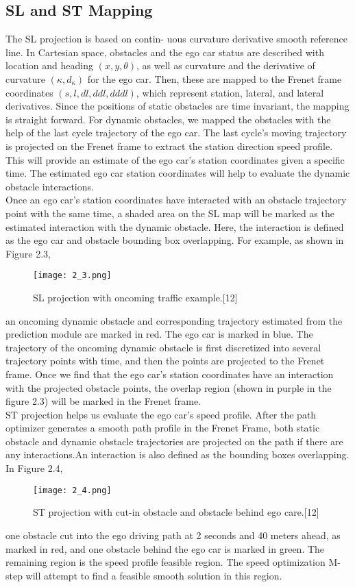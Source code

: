 \documentclass{thesisreport}
\begin{document}
\subsection{SL and ST Mapping}
The SL projection is based on contin-
uous curvature derivative smooth reference line. In Cartesian space, obstacles and the
ego car status are described with location and heading $(x, y, θ)$, as well as curvature and the derivative of curvature $(\kappa, d_{\kappa})$ for the ego car. Then, these are mapped to the Frenet frame coordinates $(s, l, dl, ddl, dddl)$, which represent station, lateral, and lateral derivatives. Since the positions of static obstacles are time invariant, the mapping is straight forward. For dynamic obstacles, we mapped the obstacles with the help of the last cycle trajectory of the ego car. The last cycle’s moving trajectory is projected on the Frenet frame to extract the station direction speed profile. This will provide an estimate of the ego car’s station coordinates given a specific time. The estimated ego car station coordinates will help to evaluate the dynamic obstacle interactions.\\
\indent
Once an ego car’s station coordinates have interacted with an obstacle trajectory point with the same time, a shaded area on the SL map will be marked as the estimated interaction with the dynamic obstacle. Here, the interaction is defined as the ego car and obstacle bounding box overlapping. For example, as shown in Figure 2.3, 
  \begin{figure}[ht]
	\centering
	\texttt{[image: 2\_3.png]}
	\caption{SL projection with oncoming traffic example.[12]}
	\label{fig:2.3} 
\end{figure}
an oncoming dynamic obstacle and corresponding trajectory estimated from the prediction module are marked in red. The ego car is marked in blue. The trajectory of the oncoming dynamic obstacle is first discretized into several trajectory points with time, and then the points are projected to the Frenet frame. Once we find that the ego car’s station coordinates have an interaction with the projected obstacle points, the overlap region (shown in purple in the figure 2.3) will be marked in the Frenet frame.\\
\indent
ST projection helps us evaluate the ego car’s speed profile. After the path optimizer generates a smooth path profile in the Frenet Frame, both static obstacle and dynamic obstacle trajectories are projected on the path if there are any interactions.An interaction is also defined as the bounding boxes overlapping. In Figure 2.4,
  \begin{figure}[ht]
	\centering
	\texttt{[image: 2\_4.png]}
	\caption{ST projection with cut-in obstacle and obstacle behind ego care.[12]}
	\label{fig:2.4} 
\end{figure}
 one obstacle cut into the ego driving path at 2 seconds and 40 meters ahead, as marked in red, and one obstacle behind the ego car is marked in green. The remaining region is the speed profile feasible region. The speed optimization M-step will attempt to find a feasible smooth solution in this region.
 
\end{document}
